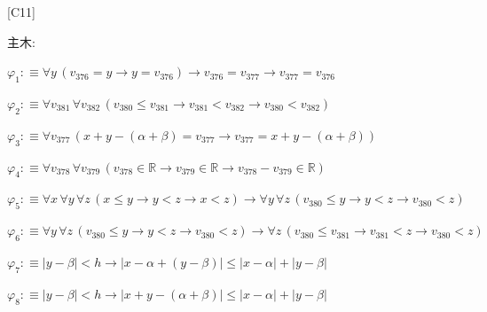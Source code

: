 \begin{fullproof}{[C11]}
\begin{ptree}
\end{ptree}
\noindent 主木:
\begin{ptree}
\noLine
{}
\noLine
{}
\end{ptree}
\begin{abbrevlist}
\item $\varphi_{1} :\equiv \forall y\,(v_{376} = y \to y = v_{376}) \to v_{376} = v_{377} \to v_{377} = v_{376}$
\item $\varphi_{2} :\equiv \forall v_{381}\,\forall v_{382}\,(v_{380} \leq v_{381} \to v_{381} < v_{382} \to v_{380} < v_{382})$
\item $\varphi_{3} :\equiv \forall v_{377}\,(x + y - (\alpha + \beta) = v_{377} \to v_{377} = x + y - (\alpha + \beta))$
\item $\varphi_{4} :\equiv \forall v_{378}\,\forall v_{379}\,(v_{378} \in \mathbb{R} \to v_{379} \in \mathbb{R} \to v_{378} - v_{379} \in \mathbb{R})$
\item $\varphi_{5} :\equiv \forall x\,\forall y\,\forall z\,(x \leq y \to y < z \to x < z) \to \forall y\,\forall z\,(v_{380} \leq y \to y < z \to v_{380} < z)$
\item $\varphi_{6} :\equiv \forall y\,\forall z\,(v_{380} \leq y \to y < z \to v_{380} < z) \to \forall z\,(v_{380} \leq v_{381} \to v_{381} < z \to v_{380} < z)$
\item $\varphi_{7} :\equiv \lvert y - \beta \rvert < h \to \lvert x - \alpha + (y - \beta) \rvert \leq \lvert x - \alpha \rvert + \lvert y - \beta \rvert$
\item $\varphi_{8} :\equiv \lvert y - \beta \rvert < h \to \lvert x + y - (\alpha + \beta) \rvert \leq \lvert x - \alpha \rvert + \lvert y - \beta \rvert$

\end{abbrevlist}
\end{fullproof}
